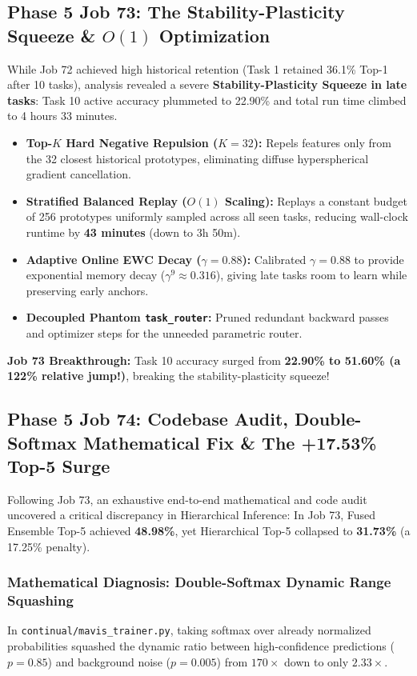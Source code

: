 \documentclass[11pt,a4paper]{article}
\begin{document}
    \subsection{Phase 5 Job 73: The Stability-Plasticity Squeeze \& $O(1)$ Optimization}
    While Job 72 achieved high historical retention (Task 1 retained 36.1\% Top-1 after 10 tasks), analysis revealed a severe \textbf{Stability-Plasticity Squeeze in late tasks}: Task 10 active accuracy plummeted to 22.90\% and total run time climbed to 4 hours 33 minutes.
    \begin{itemize}[leftmargin=*]
        \item \textbf{Top-$K$ Hard Negative Repulsion ($K=32$):} Repels features only from the 32 closest historical prototypes, eliminating diffuse hyperspherical gradient cancellation.
        \item \textbf{Stratified Balanced Replay ($O(1)$ Scaling):} Replays a constant budget of 256 prototypes uniformly sampled across all seen tasks, reducing wall-clock runtime by \textbf{43 minutes} (down to 3h 50m).
        \item \textbf{Adaptive Online EWC Decay ($\gamma = 0.88$):} Calibrated $\gamma = 0.88$ to provide exponential memory decay ($\gamma^9 \approx 0.316$), giving late tasks room to learn while preserving early anchors.
        \item \textbf{Decoupled Phantom \texttt{task\_router}:} Pruned redundant backward passes and optimizer steps for the unneeded parametric router.
    \end{itemize}
    \textbf{Job 73 Breakthrough:} Task 10 accuracy surged from \textbf{22.90\% to 51.60\% (a 122\% relative jump!)}, breaking the stability-plasticity squeeze!

    \subsection{Phase 5 Job 74: Codebase Audit, Double-Softmax Mathematical Fix \& The +17.53\% Top-5 Surge}
    Following Job 73, an exhaustive end-to-end mathematical and code audit uncovered a critical discrepancy in Hierarchical Inference: In Job 73, Fused Ensemble Top-5 achieved \textbf{48.98\%}, yet Hierarchical Top-5 collapsed to \textbf{31.73\%} (a 17.25\% penalty).
    
    \subsubsection{Mathematical Diagnosis: Double-Softmax Dynamic Range Squashing}
    In \texttt{continual/mavis\_trainer.py}, taking softmax over already normalized probabilities squashed the dynamic ratio between high-confidence predictions ($p=0.85$) and background noise ($p=0.005$) from $170\times$ down to only $2.33\times$.
\end{document}
